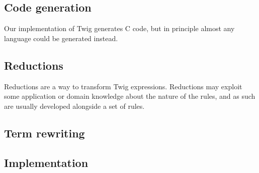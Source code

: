 \subsection{Code generation}

Our implementation of Twig generates C code, but in principle almost any
language could be generated instead.

\subsection{Reductions}

Reductions are a way to transform Twig expressions. Reductions may exploit
some application or domain knowledge about the nature of the rules, and as
such are usually developed alongside a set of rules.


\subsection{Term rewriting}
\label{section:term-rewriting}


\subsection{Implementation}

